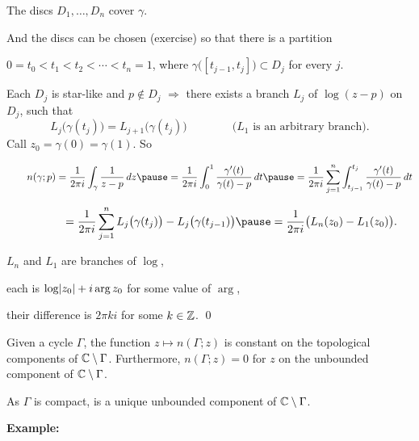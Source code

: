 \documentclass[10pt,aspectratio=169]{beamer}
\begin{document}
\begin{frame}
The discs $D_1,\ldots,D_n$ cover $\gamma$.

\medskip
\pause

And the discs can be chosen (exercise) so that
there is a partition

$0 = t_0 < t_1 < t_2 < \cdots < t_n = 1$, where
$\gamma\bigl([t_{j-1},t_j]\bigr) \subset D_j$ for every $j$.

\medskip
\pause

Each $D_j$ is star-like and $p \notin D_j$ \quad $\Rightarrow$ \quad there exists a branch $L_j$ 
of $\log (z-p)$ on $D_j$, such that
\[
L_j\bigl(\gamma(t_j)\bigr) = L_{j+1}\bigl(\gamma(t_j)\bigr)
\qquad\qquad
\text{($L_1$ is an arbitrary branch).}
\]
\pause
Call $z_0 = \gamma(0) = \gamma(1)$. \pause
So

\medskip
$\displaystyle
\qquad n(\gamma;p)
=
\frac{1}{2\pi i} \int_\gamma \frac{1}{z-p} \, dz
\pause
=
\frac{1}{2\pi i} \int_0^1 \frac{\gamma'(t)}{\gamma(t)-p} \, dt
\pause
=
\frac{1}{2\pi i} \sum_{j=1}^n \int_{t_{j-1}}^{t_j} \frac{\gamma'(t)}{\gamma(t)-p} \, dt
$
\pause

$\displaystyle
\phantom{\qquad n(\gamma;p)}
=
\frac{1}{2\pi i} \sum_{j=1}^n L_j\bigl(\gamma(t_j)\bigr) -
L_j\bigl(\gamma(t_{j-1})\bigr)
\pause
=
\frac{1}{2\pi i} \bigl( L_n(z_0) - L_1(z_0) \bigr) .
$

\medskip
\pause

$L_n$ and $L_1$ are branches of $\log$,

\pause
each is $\log\lvert {z_0} \rvert + i \arg z_0$ for some value of $\arg$,

\pause
their difference is $2\pi k i$ for some $k \in {\mathbb{Z}}$.
\qed
\end{frame}

\begin{frame}
\begin{proposition}
Given a cycle $\Gamma$,
the function $z \mapsto n(\Gamma;z)$ is constant on the
topological components of ${\mathbb{C}} \setminus \Gamma$.
\pause
Furthermore, $n(\Gamma;z) = 0$ for $z$ on the unbounded component
of ${\mathbb{C}} \setminus \Gamma$.
\end{proposition}

\pause

As $\Gamma$ is compact, is a unique unbounded component
of ${\mathbb{C}} \setminus \Gamma$.

\medskip
\pause

\textbf{Example:}

\begin{center}
\end{center}
\end{frame}
\end{document}
